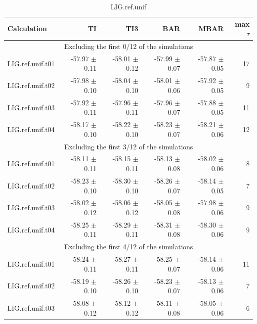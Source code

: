 \documentclass[journal=jctcce,manuscript=article,hyperref=false]{achemso}
\begin{document}
\begin{table}
\caption{LIG.ref.unif}
{\small
\begin{tabular}{l r r r r r}
\hline
                             Calculation &                 TI &                TI3 &                BAR &               MBAR & max $\tau$\\
\hline\multicolumn{6}{c}{Excluding the first 0/12 of the simulations} \\
                        LIG.ref.unif.t01 &  -57.97 $\pm$    0.11 &  -58.01 $\pm$    0.12 &  -57.99 $\pm$    0.07 &  -57.87 $\pm$    0.05 &      17 \\
                        LIG.ref.unif.t02 &  -57.98 $\pm$    0.10 &  -58.04 $\pm$    0.10 &  -58.01 $\pm$    0.06 &  -57.92 $\pm$    0.05 &       9 \\
                        LIG.ref.unif.t03 &  -57.92 $\pm$    0.11 &  -57.96 $\pm$    0.11 &  -57.96 $\pm$    0.07 &  -57.88 $\pm$    0.05 &      11 \\
                        LIG.ref.unif.t04 &  -58.17 $\pm$    0.10 &  -58.22 $\pm$    0.10 &  -58.23 $\pm$    0.07 &  -58.21 $\pm$    0.06 &      12 \\
\multicolumn{6}{c}{Excluding the first 3/12 of the simulations} \\
                        LIG.ref.unif.t01 &  -58.11 $\pm$    0.11 &  -58.15 $\pm$    0.11 &  -58.13 $\pm$    0.08 &  -58.02 $\pm$    0.06 &       8 \\
                        LIG.ref.unif.t02 &  -58.23 $\pm$    0.10 &  -58.30 $\pm$    0.10 &  -58.26 $\pm$    0.07 &  -58.14 $\pm$    0.05 &       7 \\
                        LIG.ref.unif.t03 &  -58.02 $\pm$    0.12 &  -58.06 $\pm$    0.12 &  -58.05 $\pm$    0.08 &  -57.98 $\pm$    0.06 &       9 \\
                        LIG.ref.unif.t04 &  -58.25 $\pm$    0.11 &  -58.29 $\pm$    0.11 &  -58.31 $\pm$    0.08 &  -58.30 $\pm$    0.06 &       9 \\
\multicolumn{6}{c}{Excluding the first 4/12 of the simulations} \\
                        LIG.ref.unif.t01 &  -58.24 $\pm$    0.11 &  -58.27 $\pm$    0.11 &  -58.25 $\pm$    0.07 &  -58.14 $\pm$    0.06 &      11 \\
                        LIG.ref.unif.t02 &  -58.19 $\pm$    0.10 &  -58.26 $\pm$    0.10 &  -58.23 $\pm$    0.07 &  -58.13 $\pm$    0.06 &       7 \\
                        LIG.ref.unif.t03 &  -58.08 $\pm$    0.12 &  -58.12 $\pm$    0.12 &  -58.11 $\pm$    0.08 &  -58.05 $\pm$    0.06 &       6 \\

\end{tabular}}
\end{table}
\end{document}
